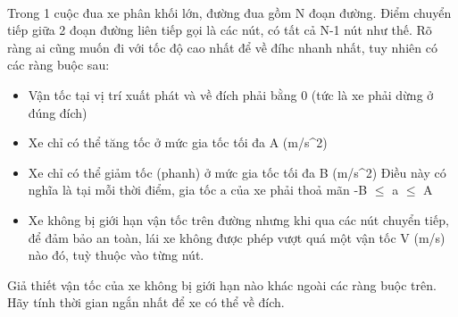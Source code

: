  

Trong 1 cuộc đua xe phân khối lớn, đường đua gồm N đoạn đường. Điểm chuyển tiếp giữa 2 đoạn đường liên tiếp gọi là các nút, có tất cả N-1 nút như thế. Rõ ràng ai cũng muốn đi với tốc độ cao nhất để về đíhc nhanh nhất, tuy nhiên có các ràng buộc sau:
\begin{itemize}
	\item Vận tốc tại vị trí xuất phát và về đích phải bằng 0 (tức là xe phải dừng ở đúng đích)
	\item Xe chỉ có thể tăng tốc ở mức gia tốc tối đa A (m/s^2)
	\item Xe chỉ có thể giảm tốc (phanh) ở mức gia tốc tối đa B (m/s^2) Điều này có nghĩa là tại mỗi thời điểm, gia tốc a của xe phải thoả mãn -B $\le$ a $\le$ A
	\item Xe không bị giới hạn vận tốc trên đường nhưng khi qua các nút chuyển tiếp, để đảm bảo an toàn, lái xe không được phép vượt quá một vận tốc V (m/s) nào đó, tuỳ thuộc vào từng nút.
\end{itemize}

Giả thiết vận tốc của xe không bị giới hạn nào khác ngoài các ràng buộc trên. Hãy tính thời gian ngắn nhất để xe có thể về đích.

\